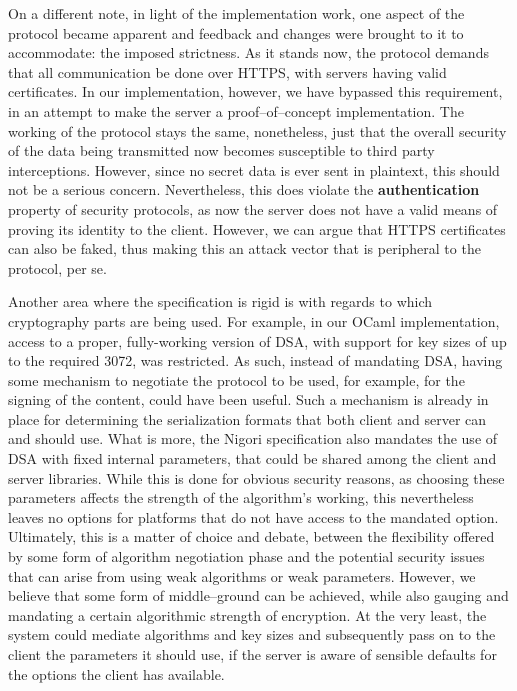 On a different note, in light of the implementation work, one aspect of the protocol became apparent and feedback and changes were brought to it to accommodate: the imposed strictness.
As it stands now, the protocol demands that all communication be done over HTTPS, with servers having valid certificates.
In our implementation, however, we have bypassed this requirement, in an attempt to make the server a proof--of--concept implementation.
The working of the protocol stays the same, nonetheless, just that the overall security of the data being transmitted now becomes susceptible to third party interceptions.
However, since no secret data is ever sent in plaintext, this should not be a serious concern.
Nevertheless, this does violate the \textbf{authentication} property of security protocols, as now the server does not have a valid means of proving its identity to the client.
However, we can argue that HTTPS certificates can also be faked, thus making this an attack vector that is peripheral to the protocol, per se.

Another area where the specification is rigid is with regards to which cryptography parts are being used.
For example, in our OCaml implementation, access to a proper, fully-working version of DSA, with support for key sizes of up to the required 3072, was restricted.
As such, instead of mandating DSA, having some mechanism to negotiate the protocol to be used, for example, for the signing of the content, could have been useful.
Such a mechanism is already in place for determining the serialization formats that both client and server can and should use.
What is more, the Nigori specification also mandates the use of DSA with fixed internal parameters, that could be shared among the client and server libraries.
While this is done for obvious security reasons, as choosing these parameters affects the strength of the algorithm's working, this nevertheless leaves no options for platforms that do not have access to the mandated option.
Ultimately, this is a matter of choice and debate, between the flexibility offered by some form of algorithm negotiation phase and the potential security issues that can arise from using weak algorithms or weak parameters.
However, we believe that some form of middle--ground can be achieved, while also gauging and mandating a certain algorithmic strength of encryption.
At the very least, the system could mediate algorithms and key sizes and subsequently pass on to the client the parameters it should use, if the server is aware of sensible defaults for the options the client has available.


